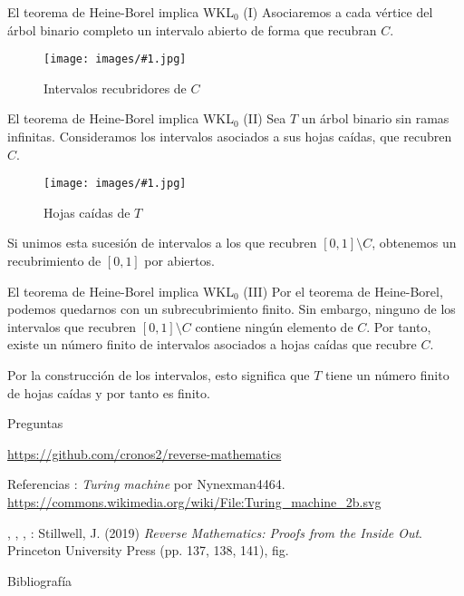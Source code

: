 \documentclass[10pt]{beamer}
\newcommand{\ffigure}[2]{
  \begin{figure}[h!]
    \centering
    \texttt{[image: images/\#1.jpg]}
    \caption{#2}
    \label{fig:#1}
  \end{figure}
}
\begin{document}
\begin{frame}[fragile]{El teorema de Heine-Borel implica WKL$_0$ (I)}
  Asociaremos a cada vértice del árbol binario completo un intervalo abierto de forma que recubran $C$.

  \ffigure{covering-intervals}{Intervalos recubridores de $C$}

\end{frame}

\begin{frame}[fragile]{El teorema de Heine-Borel implica WKL$_0$ (II)}
  Sea $T$ un árbol binario sin ramas infinitas. Consideramos los intervalos asociados a sus hojas caídas, que recubren $C$.

  \ffigure{fallen-leaves}{Hojas caídas de $T$}


  Si unimos esta sucesión de intervalos a los que recubren $[0, 1] \setminus C$, obtenemos un recubrimiento de $[0, 1]$ por abiertos.
\end{frame}

\begin{frame}[fragile]{El teorema de Heine-Borel implica WKL$_0$ (III)}
  Por el teorema de Heine-Borel, podemos quedarnos con un subrecubrimiento finito. Sin embargo, ninguno de los intervalos que recubren $[0, 1] \setminus C$ contiene ningún elemento de $C$. Por tanto, existe un número finito de intervalos asociados a hojas caídas que recubre $C$.

  \vfill

  Por la construcción de los intervalos, esto significa que $T$ tiene un número finito de hojas caídas y por tanto es finito.
\end{frame}

\begin{frame}[standout]
  Preguntas

  \vfill

  \normalsize \url{https://github.com/cronos2/reverse-mathematics}
\end{frame}

\appendix

\begin{frame}[fragile]{Referencias}
  : \textit{Turing machine} por Nynexman4464. \url{https://commons.wikimedia.org/wiki/File:Turing_machine_2b.svg}

  \vfill

  , , , : Stillwell, J. (2019) \textit{Reverse Mathematics: Proofs from the Inside Out}. Princeton University Press (pp. 137, 138, 141), fig.
\end{frame}

\begin{frame}[allowframebreaks]{Bibliografía}
  \nocite{*}
  \printbibliography[heading=none]
\end{frame}
\end{document}
